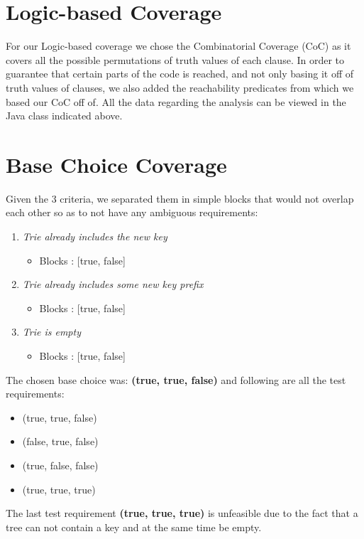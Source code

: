 \documentclass[12pt]{article}
\begin{document}
\section[Logic-based Coverage]{Logic-based Coverage}

For our Logic-based coverage we chose the Combinatorial Coverage (CoC) as it covers all the possible permutations of truth values of each clause. In order to guarantee that certain parts of the code is reached, and not only basing it off of truth values of clauses, we also added the reachability predicates from which we based our CoC off of. All the data regarding the analysis can be viewed in the Java class indicated above.

\section{Base Choice Coverage}
Given the 3 criteria, we separated them in simple blocks that would not overlap each other so as to not have any ambiguous requirements:
\begin{enumerate}
	\item \textit{Trie already includes the new key}
		\begin{itemize}
			\item Blocks : [true, false]
		\end{itemize}
	\item \textit{Trie already includes some new key prefix}
		\begin{itemize}
			\item Blocks : [true, false]
		\end{itemize}
	\item \textit{Trie is empty}
		\begin{itemize}
			\item Blocks : [true, false]
		\end{itemize}
\end{enumerate}

The chosen base choice was: \textbf{(true, true, false)} and following are all the test requirements: 
	\begin{itemize}
	 	\item (true, true, false)
	 	\item (false, true, false)
	 	\item (true, false, false)
	 	\item (true, true, true)
	\end{itemize}
	
The last test requirement \textbf{(true, true, true)} is unfeasible due to the fact that a tree can not contain a key and at the same time be empty.
\end{document}
